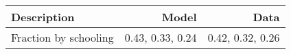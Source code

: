 \begin{tabular}{lrr}
\hline
Description & Model  & Data  \\ 
\hline
Fraction by schooling & 0.43, 0.33, 0.24  & 0.42, 0.32, 0.26  \\ 
\hline
\end{tabular}%

